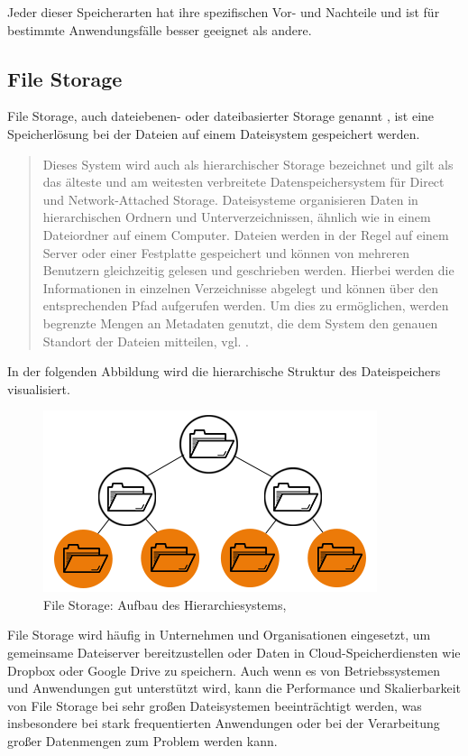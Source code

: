 Jeder dieser Speicherarten hat ihre spezifischen Vor- und Nachteile und ist für bestimmte Anwendungsfälle besser geeignet als andere. 

\newpage
 
\subsection{File Storage}

File Storage, auch dateiebenen- oder dateibasierter Storage genannt \cite{redHat-storage}, ist eine Speicherlösung bei der Dateien auf einem Dateisystem gespeichert werden. 

\begin{quote}
	Dieses System wird auch als hierarchischer Storage bezeichnet und gilt als das älteste und am weitesten verbreitete Datenspeichersystem für Direct und Network-Attached Storage. Dateisysteme organisieren Daten in hierarchischen Ordnern und Unterverzeichnissen, ähnlich wie in einem Dateiordner auf einem Computer. Dateien werden in der Regel auf einem Server oder einer Festplatte gespeichert und können von mehreren Benutzern gleichzeitig gelesen und geschrieben werden. Hierbei werden die Informationen in einzelnen Verzeichnisse abgelegt und können über den entsprechenden Pfad aufgerufen werden. Um dies zu ermöglichen, werden begrenzte Mengen an Metadaten genutzt, die dem System den genauen Standort der Dateien mitteilen, vgl. \citeauthor{redHat-storage}.
\end{quote}

In der folgenden Abbildung wird die hierarchische Struktur des Dateispeichers visualisiert.\\

\begin{figure}[h]
\centering
	\includegraphics{Pictures/FileStorageHierarchy.png}
	\caption{File Storage: Aufbau des Hierarchiesystems, \citeauthor{redHat-storage}}
\end{figure}

File Storage wird häufig in Unternehmen und Organisationen eingesetzt, um gemeinsame Dateiserver bereitzustellen oder Daten in Cloud-Speicherdiensten wie Dropbox oder Google Drive zu speichern.
Auch wenn es von Betriebssystemen und Anwendungen gut unterstützt wird, kann die Performance und Skalierbarkeit von File Storage bei sehr großen Dateisystemen beeinträchtigt werden, was insbesondere bei stark frequentierten Anwendungen oder bei der Verarbeitung großer Datenmengen zum Problem werden kann. 


